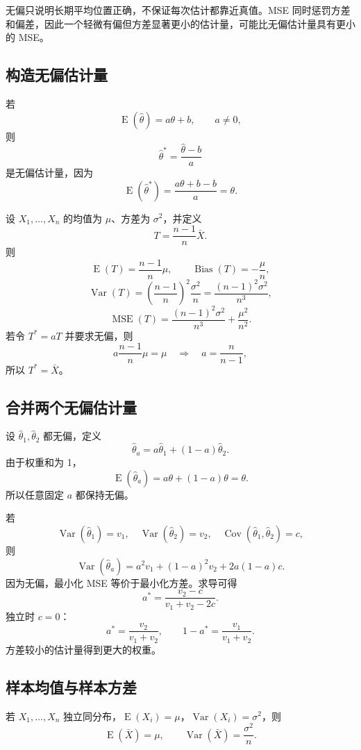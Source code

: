 \documentclass[11pt,a4paper]{article}
\newcommand{\E}{\operatorname{E}}
\newcommand{\Var}{\operatorname{Var}}
\newcommand{\Cov}{\operatorname{Cov}}
\newcommand{\Bias}{\operatorname{Bias}}
\newcommand{\MSE}{\operatorname{MSE}}
\newcommand{\1}{\mathbf{1}}
\begin{document}
\begin{conceptbox}
无偏只说明长期平均位置正确，不保证每次估计都靠近真值。MSE 同时惩罚方差和偏差，因此一个轻微有偏但方差显著更小的估计量，可能比无偏估计量具有更小的 MSE。
\end{conceptbox}

\subsection{构造无偏估计量}

若
\[
  \E(\hat\theta)=a\theta+b,\qquad a\ne 0,
\]
则
\[
  \boxed{\hat\theta^*=\frac{\hat\theta-b}{a}}
\]
是无偏估计量，因为
\[
  \E(\hat\theta^*)=\frac{a\theta+b-b}{a}=\theta.
\]

\begin{examplebox}
设 $X_1,\ldots,X_n$ 的均值为 $\mu$、方差为 $\sigma^2$，并定义
\[
  T=\frac{n-1}{n}\bar X.
\]
则
\[
  \E(T)=\frac{n-1}{n}\mu,
  \qquad
  \Bias(T)=-\frac{\mu}{n},
\]
\[
  \Var(T)
  =
  \left(\frac{n-1}{n}\right)^2\frac{\sigma^2}{n}
  =
  \frac{(n-1)^2\sigma^2}{n^3},
\]
\[
  \MSE(T)
  =
  \frac{(n-1)^2\sigma^2}{n^3}
  +
  \frac{\mu^2}{n^2}.
\]
若令 $T^*=aT$ 并要求无偏，则
\[
  a\frac{n-1}{n}\mu=\mu
  \quad\Longrightarrow\quad
  a=\frac{n}{n-1},
\]
所以 $T^*=\bar X$。
\end{examplebox}

\subsection{合并两个无偏估计量}

设 $\hat\theta_1,\hat\theta_2$ 都无偏，定义
\[
  \hat\theta_a=a\hat\theta_1+(1-a)\hat\theta_2.
\]
由于权重和为 1，
\[
  \E(\hat\theta_a)=a\theta+(1-a)\theta=\theta.
\]
所以任意固定 $a$ 都保持无偏。

若
\[
  \Var(\hat\theta_1)=v_1,\quad
  \Var(\hat\theta_2)=v_2,\quad
  \Cov(\hat\theta_1,\hat\theta_2)=c,
\]
则
\[
  \Var(\hat\theta_a)
  =
  a^2v_1+(1-a)^2v_2+2a(1-a)c.
\]
因为无偏，最小化 MSE 等价于最小化方差。求导可得
\[
  \boxed{
  a^*=\frac{v_2-c}{v_1+v_2-2c}.
  }
\]
独立时 $c=0$：
\[
  \boxed{
  a^*=\frac{v_2}{v_1+v_2},
  \qquad
  1-a^*=\frac{v_1}{v_1+v_2}.
  }
\]
方差较小的估计量得到更大的权重。

\subsection{样本均值与样本方差}

若 $X_1,\ldots,X_n$ 独立同分布，$\E(X_i)=\mu$，$\Var(X_i)=\sigma^2$，则
\[
  \boxed{\E(\bar X)=\mu,\qquad \Var(\bar X)=\frac{\sigma^2}{n}.}
\]
\end{document}
